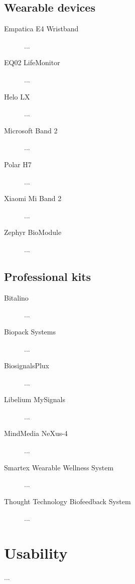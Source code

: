 \documentclass[binding=0.6cm,LaM]{sapthesis}
\begin{document}
\subsection{Wearable devices}

\begin{description}

\item[Empatica E4 Wristband]
...

\item[EQ02 LifeMonitor]
...

\item[Helo LX]
...

\item[Microsoft Band 2]
...

\item[Polar H7]
...

\item[Xiaomi Mi Band 2]
...

\item[Zephyr BioModule]
...

\end{description}

\subsection{Professional kits}

\begin{description}

\item[Bitalino]
...

\item[Biopack Systems]
...

\item[BiosignalsPlux]
...

\item[Libelium MySignals]
...

\item[MindMedia NeXus-4]
...

\item[Smartex Wearable Wellness System]
...

\item[Thought Technology Biofeedback System]
...

\end{description}


\newpage
\section{Usability}
...
\end{document}
